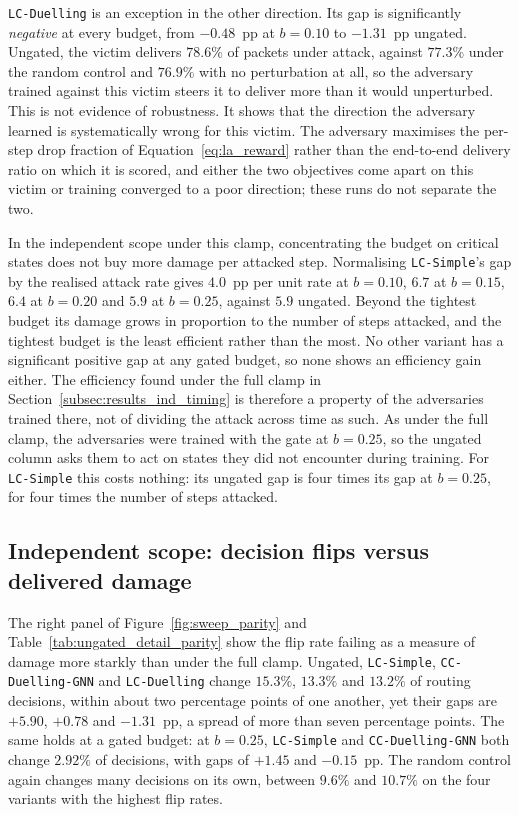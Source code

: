 \texttt{LC-Duelling} is an exception in the other direction. Its gap is significantly
\emph{negative} at every budget, from $-0.48$~pp at $b = 0.10$ to $-1.31$~pp ungated.
Ungated, the victim delivers $78.6\%$ of packets under attack, against $77.3\%$ under
the random control and $76.9\%$ with no perturbation at all, so the adversary trained
against this victim steers it to deliver more than it would unperturbed. This is not
evidence of robustness. It shows that the direction the adversary learned is
systematically wrong for this victim. The adversary maximises the per-step drop
fraction of Equation~\eqref{eq:la_reward} rather than the end-to-end delivery ratio on
which it is scored, and either the two objectives come apart on this victim or training
converged to a poor direction; these runs do not separate the two.

In the independent scope under this clamp, concentrating the budget on critical states
does not buy more damage per attacked step. Normalising \texttt{LC-Simple}'s gap by the realised attack rate
gives $4.0$~pp per unit rate at $b = 0.10$, $6.7$ at $b = 0.15$, $6.4$ at $b = 0.20$
and $5.9$ at $b = 0.25$, against $5.9$ ungated. Beyond the tightest budget its damage
grows in proportion to the number of steps attacked, and the tightest budget is the
least efficient rather than the most. No other variant has a significant positive gap
at any gated budget, so none shows an efficiency gain either. The efficiency found under
the full clamp in Section~\ref{subsec:results_ind_timing} is therefore a property of
the adversaries trained there, not of dividing the attack across time as such. As under
the full clamp, the adversaries were trained with the gate at $b = 0.25$, so the
ungated column asks them to act on states they did not encounter during training. For
\texttt{LC-Simple} this costs nothing: its ungated gap is four times its gap at
$b = 0.25$, for four times the number of steps attacked.

\subsection{Independent scope: decision flips versus delivered damage}
\label{subsec:results_parity_flips}

The right panel of Figure~\ref{fig:sweep_parity} and
Table~\ref{tab:ungated_detail_parity} show the flip rate failing as a measure of damage
more starkly than under the full clamp. Ungated, \texttt{LC-Simple},
\texttt{CC-Duelling-GNN} and \texttt{LC-Duelling} change $15.3\%$, $13.3\%$ and
$13.2\%$ of routing decisions, within about two percentage points of one another, yet
their gaps are $+5.90$, $+0.78$ and $-1.31$~pp, a spread of more than seven percentage
points. The same holds at a gated budget: at $b = 0.25$, \texttt{LC-Simple} and
\texttt{CC-Duelling-GNN} both change $2.92\%$ of decisions, with gaps of $+1.45$ and
$-0.15$~pp. The random control again changes many decisions on its own, between $9.6\%$
and $10.7\%$ on the four variants with the highest flip rates.

